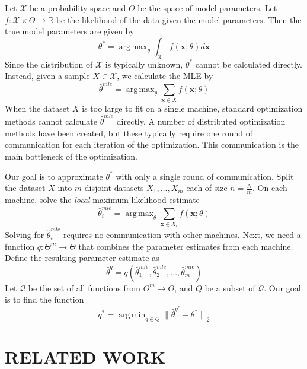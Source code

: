 \documentclass[twoside]{article}
\DeclareMathOperator*{\argmin}{arg\,min}
\DeclareMathOperator*{\argmax}{arg\,max}
\newcommand{\Q}{\mathcal{Q}}
\newcommand{\X}{\mathcal{X}}
\newcommand{\x}{\mathbf{x}}
\newcommand{\w}{\theta}
\newcommand{\wmle}{\hat\w^{mle}}
\newcommand{\wstar}{{\w^{*}}}
\newcommand{\wq}{\hat\w^{q}}
\newcommand{\wqstar}{\hat\w^{q^*}}
\newcommand{\dist}{\mathcal{D}}
\newcommand{\trans}[1]{\ensuremath{{#1}^{\mathsf{T}}}}
\newcommand{\ltwo}[1]{{\lVert {#1} \rVert}_2}
\begin{document}
Let $\X$ be a probability space
and $\Theta$ be the space of model parameters.
Let $f : \X \times \Theta \to \mathbb{R}$ be the likelihood of the data given the model parameters.
Then the true model parameters are given by
\begin{equation}
\wstar = \argmax_\w \int_\X f(\x;\w) d\x
\end{equation}
Since the distribution of $\X$ is typically unknown, $\wstar$ cannot be calculated directly.
Instead, given a sample $X\in\X$, we calculate the MLE by
\begin{equation}
\wmle=\argmax_\w \sum_{\x\in X} f(\x;\w)
\end{equation}
When the dataset $X$ is too large to fit on a single machine,
standard optimization methods cannot calculate $\wmle$ directly.
A number of distributed optimization methods have been created,
but these typically require one round of communication for each iteration of the optimization.
This communication is the main bottleneck of the optimization.

Our goal is to approximate $\wstar$ with only a single round of communication.
Split the dataset $X$ into $m$ disjoint datasets $X_1,...,X_m$ each of size $n=\frac{N}{m}$.
On each machine, solve the \emph{local} maximum likelihood estimate
\begin{equation}
\wmle_i = \argmax_\w \sum_{\x\in X_i} f(\x;\w)
\end{equation}
Solving for $\wmle_i$ requires no communication with other machines.
Next, we need a function $q : \Theta^m \to \Theta$ that combines the parameter estimates from each machine.
Define the resulting parameter estimate as
\begin{equation}
\wq = q(\wmle_1, \wmle_2, ..., \wmle_m)
\end{equation}
Let $\Q$ be the set of all functions from $\Theta^m\to\Theta$,
and $Q$ be a subset of $\Q$.
Our goal is to find the function
\begin{equation}
q^* = \argmin_{q\in Q} \ltwo{\wqstar - \wstar}
\end{equation}

\section{RELATED WORK}
\end{document}
